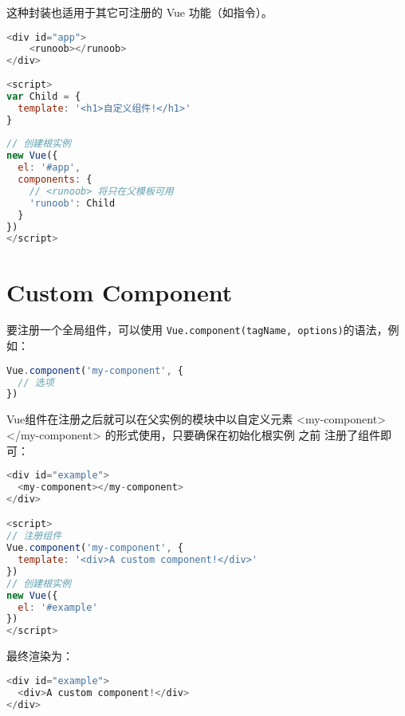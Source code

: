 这种封装也适用于其它可注册的 Vue 功能（如指令）。

\begin{lstlisting}[language=JavaScript]
<div id="app">
    <runoob></runoob>
</div>
 
<script>
var Child = {
  template: '<h1>自定义组件!</h1>'
}
 
// 创建根实例
new Vue({
  el: '#app',
  components: {
    // <runoob> 将只在父模板可用
    'runoob': Child
  }
})
</script>
\end{lstlisting}

\section{Custom Component}

要注册一个全局组件，可以使用 \texttt{Vue.component(tagName, options)}的语法，例如：

\begin{lstlisting}[language=JavaScript]
Vue.component('my-component', {
  // 选项
})
\end{lstlisting}


Vue组件在注册之后就可以在父实例的模块中以自定义元素 <my-component></my-component> 的形式使用，只要确保在初始化根实例 之前 注册了组件即可：


\begin{lstlisting}[language=JavaScript]
<div id="example">
  <my-component></my-component>
</div>

<script>
// 注册组件
Vue.component('my-component', {
  template: '<div>A custom component!</div>'
})
// 创建根实例
new Vue({
  el: '#example'
})
</script>
\end{lstlisting}

最终渲染为：

\begin{lstlisting}[language=JavaScript]
<div id="example">
  <div>A custom component!</div>
</div>
\end{lstlisting}




\begin{lstlisting}[language=JavaScript]

\end{lstlisting}




\begin{lstlisting}[language=JavaScript]

\end{lstlisting}



